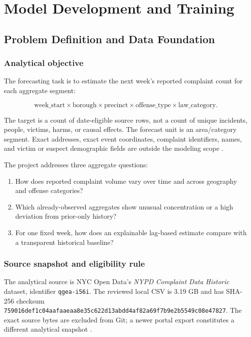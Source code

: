 \documentclass[11pt,oneside]{report}
\begin{document}
\part{Model Development and Training}

\chapter{Problem Definition and Data Foundation}

\section{Analytical objective}

The forecasting task is to estimate the next week's reported complaint count
for each aggregate segment:

\begin{equation}
  \text{week\_start} \times \text{borough} \times \text{precinct}
  \times \text{offense\_type} \times \text{law\_category}.
\end{equation}

The target is a count of date-eligible source rows, not a count of unique
incidents, people, victims, harms, or causal effects. The forecast unit is an
area/category segment. Exact addresses, exact event coordinates, complaint
identifiers, names, and victim or suspect demographic fields are outside the
modeling scope \cite{cleaningreport,finalreport}.

The project addresses three aggregate questions:

\begin{enumerate}
  \item How does reported complaint volume vary over time and across geography
    and offense categories?
  \item Which already-observed aggregates show unusual concentration or a high
    deviation from prior-only history?
  \item For one fixed week, how does an explainable lag-based estimate compare
    with a transparent historical baseline?
\end{enumerate}

\section{Source snapshot and eligibility rule}

The analytical source is NYC Open Data's \emph{NYPD Complaint Data Historic}
dataset, identifier \nolinkurl{qgea-i56i}. The reviewed local CSV is 3.19 GB and
has SHA-256 checksum
\nolinkurl{759016def1c04aafaaeaa8e35c622d13abdd4af82a69f7b9e2b5549c08e47827}.
The exact source bytes are excluded from Git; a newer portal export constitutes
a different analytical snapshot \cite{provenance}.
\end{document}
